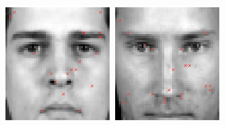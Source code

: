 \begin{figure}
\begin{center}
\includegraphics[width=\textwidth/9]{ch4/figures/NoC1.png}
\includegraphics[width=\textwidth/9]{ch4/figures/NoC2.png}

\end{center}
\end{figure}
